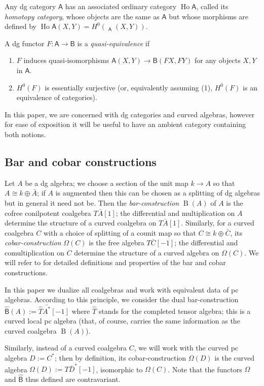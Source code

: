 \documentclass[a4paper]{amsart}
\theoremstyle{plain}
\theoremstyle{definition}
\theoremstyle{remark}
\DeclareMathOperator{\Ho}{Ho}
\DeclareMathOperator{\Homdg}{\underline{Hom}}
\newcommand{\cat}[1]{\mathsf{#1}}
\newcommand{\hB}{\widehat{\mathsf{B}}}
\numberwithin{equation}{section}
\theoremstyle{plain}
\begin{document}
	Any dg category $\cat{A}$ has an associated ordinary category $\Ho\cat{A}$, called its \emph{homotopy category}, whose objects are the same as $\cat{A}$ but whose morphisms are defined by $\Ho\cat{A}(X,Y) = H^0(\Homdg_{\cat{A}}(X,Y))$.
	
	A dg functor $F \colon \cat{A} \to \cat{B}$ is a \emph{quasi-equivalence} if
	\begin{enumerate}
		\item $F$ induces quasi-isomorphisms $\cat{A}(X,Y) \to \cat{B}(FX,FY)$ for any objects $X, Y$ in $\cat{A}$. 
		\item $H^0(F)$ is essentially surjective (or, equivalently assuming (1), $H^0(F)$ is an equivalence of categories). 
	\end{enumerate}
	In this paper, we are concerned with dg categories and curved algebras, however for ease of exposition it will be useful to have an ambient category containing both notions.
	\subsection{Bar and cobar constructions} Let $A$ be a dg algebra; we choose a section of the unit map $k\to A$ so that $A\cong k\oplus \bar{A}$; if $A$ is augmented then this can be chosen as a splitting of dg algebras but in general it need not be. 
	Then the \emph{bar-construction} $\operatorname{B}(A)$ of $A$ is the cofree conilpotent coalgebra $T\bar{A}[1]$; the differential and multiplication on $A$ determine the structure of a curved coalgebra on $T\bar{A}[1]$.    Similarly, for a curved coalgebra $C$ with a choice of splitting of a counit map so that $C\cong k\oplus \bar C$, its \emph{cobar-construction} $\Omega(C)$ is the free algebra $T\bar{C}[-1]$; the differential and comultiplication on $C$ determine the structure of a curved algebra on $\Omega(C)$. We will refer to \cite[Section 6.1]{pos11} for detailed definitions and properties of the bar and cobar constructions.
	
	In this paper we dualize all coalgebras and work with equivalent data of pc algebras. According to this principle, we consider the dual bar-construction $\hB(A):=\hat{T}\bar{A^*}[-1]$ where $\hat{T}$ stands for the completed tensor algebra; this is a curved local pc algebra (that, of course, carries the same information as the curved coalgebra $\operatorname{B}(A)$). 
	
	Similarly, instead of a curved coalgebra $C$, we will work with the curved pc algebra $D:=C^*$; then by definition, its cobar-construction $\Omega(D)$ is the curved algebra $\Omega(D):=T\bar{D}^*[-1]$, isomorphic to $\Omega(C)$. Note that the functors $\Omega$ and $\hB$ thus defined are contravariant.
	
\end{document}
